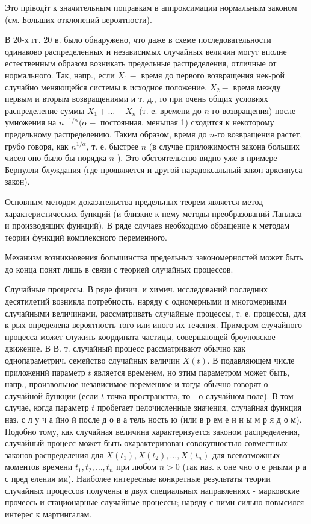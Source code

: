 \documentclass[10pt]{article}
\begin{document}
Это пріводіт к значительным поправкам в аппроксимации нормальным законом (см. Больших отклонений вероятности).



В 20-х гг. 20 в. было обнаружено, что даже в схеме последовательности одинаково распределенных и независимых случайных величин могут вполне естественным образом возникать предельные распределения, отличные от нормального. Так, напр., если $X_{1}-$ время до первого возвращения нек-рой случайно меняющейся системы в исходное положение, $X_{2}-$ время между первым и вторым возвращениями и т. д., то при очень общих условиях распределение суммы $X_{1}+\ldots+X_{n}$ (т. е. времени до $n$-го возвращения) после умножения на $n^{-1 / \alpha}(\alpha-$ постоянная, меньшая 1) сходится к некоторому предельному распределению. Таким образом, время до $n$-го возвращения растет, грубо говоря, как $n^{1 / \alpha}$, т. е. быстрее $n$ (в случае приложимости закона больших чисел оно было бы порядка $n$ ). Это обстоятельство видно уже в примере Бернулли блуждания (где проявляется и другой парадоксальный закон арксинуса закон).



Основным методом доказательства предельных теорем является метод характеристических бункций (и близкие к нему методы преобразований Лапласа и производящих функций). В ряде случаев необходимо обращение к методам теории функций комплексного переменного.



Механизм возникновения большинства предельных закономерностей может быть до конца понят лишь в связи с теорией случайных процессов.



Случайные процессы. В ряде физич. и химич. исследований последних десятилетий возникла потребность, наряду с одномерными и многомерными случайными величинами, рассматривать случайные процессы, т. е. процессы, для к-рых определена вероятность того или иного их течения. Примером случайного процесса может служить координата частицы, совершающей броуновское движение. В В. т. случайный процесс рассматривают обычно как однопараметрич. семейство случайных величин $X(t)$. В подавляющем числе приложений параметр $t$ является временем, но этим параметром может быть, напр., произвольное независимое переменное и тогда обычно говорят о случайной бункции (если $t$ точка пространства, то - о случайном поле). В том случае, когда параметр $t$ пробегает целочисленные значения, случайная функция наз. с л у ч а йно й после д о в а тель ность ю (или в р ем е н н ы м р я д о м). Подобно тому, как случайная величина характеризуется законом распределения, случайный процесс может быть охарактеризован совокупностью совместных законов распределения для $X\left(t_{1}\right), X\left(t_{2}\right), \ldots, X\left(t_{n}\right)$ для всевозможных моментов времени $t_{1}, t_{2}, \ldots, t_{n}$ при любом $n>0$ (так наз. к оне чно о е рными р а с пред еления ми). Наиболее интересные конкретные результаты теории случайных процессов получены в двух специальных направлениях - марковские прочессь и стационарные случайные процессы; наряду с ними сильно повысился интерес к мартингалам.
\end{document}
